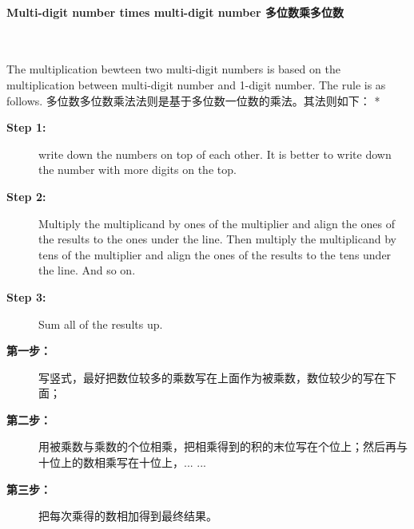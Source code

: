\paragraph{Multi-digit number times multi-digit number 多位数乘多位数}
\ \  

\begin{paracol}{2}
The multiplication bewteen two multi-digit numbers is based on the multiplication between multi-digit number and 1-digit number. The rule is as follows.
\switchcolumn[1]
多位数多位数乘法法则是基于多位数一位数的乘法。其法则如下：
\switchcolumn[0]*
\begin{description}
\item [{\bf Step 1:} ] write down the numbers on top of each other. It is better to write down the number with more digits on the top.
\item [{\bf Step 2:} ] Multiply the multiplicand by ones of the multiplier and align the ones of the results to the ones under the line. Then multiply the multiplicand by tens of the multiplier and align the ones of the results to the tens under the line. And so on.
\item [{\bf Step 3:} ] Sum all of the results up.
\end{description}
\switchcolumn[1]
\begin{description}
\item [{\bf 第一步：} ] 写竖式，最好把数位较多的乘数写在上面作为被乘数，数位较少的写在下面；
\item [{\bf 第二步：} ] 用被乘数与乘数的个位相乘，把相乘得到的积的末位写在个位上；然后再与十位上的数相乘写在十位上，... ...
\item [{\bf 第三步：} ] 把每次乘得的数相加得到最终结果。
\end{description}
\end{paracol}

